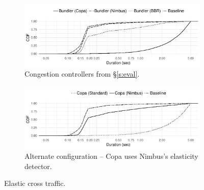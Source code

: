 \begin{figure}
    \centering
    \begin{subfigure}[b]{0.5\textwidth}
\begin{knitrout}
\color{fgcolor}
\includegraphics[width=\maxwidth]{figure/robust:cr-elastic:a-1} 

\end{knitrout}
    \caption{Congestion controllers from \S\ref{s:eval}.}\label{fig:robust:cr-elastic:a}
    \end{subfigure}
    \begin{subfigure}[b]{0.5\textwidth}
\begin{knitrout}
\color{fgcolor}
\includegraphics[width=\maxwidth]{figure/robust:cr-elastic:b-1} 

\end{knitrout}
    \caption{Alternate configuration -- Copa uses Nimbus's elasticity detector.}\label{fig:robust:cr-elastic:b}
    \end{subfigure}

    \caption{Elastic cross traffic.  }
    \label{fig:robust:cr-elastic}
\end{figure}
